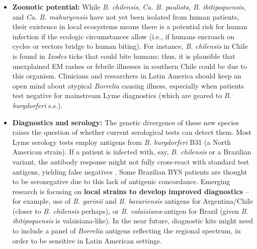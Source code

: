 \documentclass[11pt,letterpaper]{article}
\begin{document}
\begin{itemize}
    \item \textbf{Zoonotic potential:} While \textit{B. chilensis}, \textit{Ca. B. paulista}, \textit{B. ibitipoquensis}, and \textit{Ca. B. mahuryensis} have not yet been isolated from human patients, their existence in local ecosystems means there is a potential risk for human infection if the ecologic circumstances allow (i.e., if humans encroach on cycles or vectors bridge to human biting). For instance, \textit{B. chilensis} in Chile is found in \textit{Ixodes} ticks that could bite humans; thus, it is plausible that unexplained EM rashes or febrile illnesses in southern Chile could be due to this organism. Clinicians and researchers in Latin America should keep an open mind about atypical \textit{Borrelia} causing illness, especially when patients test negative for mainstream Lyme diagnostics (which are geared to \textit{B. burgdorferi} s.s.).

    \item \textbf{Diagnostics and serology:} The genetic divergence of these new species raises the question of whether current serological tests can detect them. Most Lyme serology tests employ antigens from \textit{B. burgdorferi} B31 (a North American strain). If a patient is infected with, say, \textit{B. chilensis} or a Brazilian variant, the antibody response might not fully cross-react with standard test antigens, yielding false negatives \citep{Yoshinari2022ag, Yoshinari2022ah}. Some Brazilian BYS patients are thought to be seronegative due to this lack of antigenic concordance. Emerging research is focusing on \textbf{local strains to develop improved diagnostics} – for example, use of \textit{B. garinii} and \textit{B. bavariensis} antigens for Argentina/Chile (closer to \textit{B. chilensis} perhaps), or \textit{B. valaisiana}-antigen for Brazil (given \textit{B. ibitipoquensis} is valaisiana-like). In the near future, diagnostic kits might need to include a panel of \textit{Borrelia} antigens reflecting the regional spectrum, in order to be sensitive in Latin American settings.


\end{itemize}
\end{document}

